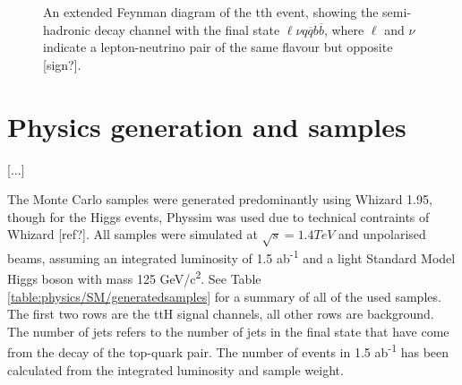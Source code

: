 \begin{figure}
	\caption{An extended Feynman diagram of the tth event, showing the semi-hadronic decay channel  with the final state $\ell\nu q\overline{q}b\overline{b}$, where $\ell$ and $\nu$ indicate a lepton-neutrino pair of the same flavour but opposite [sign?].}
	\label{figure:physics/SM/feynman-tth-semileptonic}
\end{figure}

\section{Physics generation and samples}
[...]

The Monte Carlo samples were generated predominantly using Whizard 1.95, though for the Higgs events, Physsim was used due to technical contraints of Whizard [ref?]. All samples were simulated at $\sqrt{s} = 1.4TeV$ and unpolarised beams, assuming an integrated luminosity of 1.5 ab\textsuperscript{-1} and a light Standard Model Higgs boson with mass 125 GeV/c\textsuperscript{2}. See Table \ref{table:physics/SM/generatedsamples} for a summary of all of the used samples. The first two rows are the ttH signal channels, all other rows are background. The number of jets refers to the number of jets in the final state that have come from the decay of the top-quark pair. The number of events in 1.5 ab\textsuperscript{-1} has been calculated from the integrated luminosity and sample weight.


